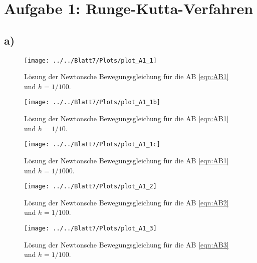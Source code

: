 \section*{Aufgabe 1: Runge-Kutta-Verfahren}

  \subsection*{a)}

    \begin{figure}
      \centering
      \texttt{[image: ../../Blatt7/Plots/plot\_A1\_1]}
      \caption{Lösung der Newtonsche Bewegungsgleichung für die AB \ref{eqn:AB1} und $h=1/100$.}
      \label{fig:A11}
    \end{figure}
    \begin{figure}
      \centering
      \texttt{[image: ../../Blatt7/Plots/plot\_A1\_1b]}
      \caption{Lösung der Newtonsche Bewegungsgleichung für die AB \ref{eqn:AB1} und $h=1/10$.}
      \label{fig:A11b}
    \end{figure}
    \begin{figure}
      \centering
      \texttt{[image: ../../Blatt7/Plots/plot\_A1\_1c]}
      \caption{Lösung der Newtonsche Bewegungsgleichung für die AB \ref{eqn:AB1} und $h=1/1000$.}
      \label{fig:A11c}
    \end{figure}

    \begin{figure}
      \centering
      \texttt{[image: ../../Blatt7/Plots/plot\_A1\_2]}
      \caption{Lösung der Newtonsche Bewegungsgleichung für die AB \ref{eqn:AB2} und $h=1/100$.}
      \label{fig:A12}
    \end{figure}
    \begin{figure}
      \centering
      \texttt{[image: ../../Blatt7/Plots/plot\_A1\_3]}
      \caption{Lösung der Newtonsche Bewegungsgleichung für die AB \ref{eqn:AB3} und $h=1/100$.}
      \label{fig:A13}
    \end{figure}

